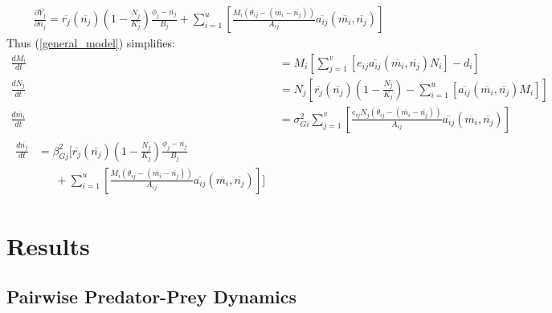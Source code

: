 \documentclass{amsart}
\theoremstyle{definition}
\theoremstyle{remark}
\numberwithin{equation}{section}
\begin{document}
\begin{equation}
	\label{model_2_prey_fitness_partial}
	\begin{aligned}
		\frac{\partial \overline{Y_j}}{\partial \overline{n_j}} = \overline{r_j}(\overline{n_j})\left(1 - \frac{N_j}{K_j}\right)\frac{\phi_j - \overline{n_j}}{B_j} + \sum\limits_{i = 1}^{u}\left[\frac{M_i(\theta_{ij} - (\overline{m_i} - \overline{n_j}))}{A_{ij}}\overline{a_{ij}}(\overline{m_i}, \overline{n_j})\right]
	\end{aligned}
\end{equation}
Thus (\ref{general_model}) simplifies:
\begin{subequations}
	\label{model2}
	\begin{align}
		\label{eq:model2_a}
		\frac{dM_i}{dt} &= M_i\left[\sum\limits_{j = 1}^{v}\left[e_{ij}\overline{a_{ij}}(\overline{m_i}, \overline{n_j})N_i\right] - d_i\right] \\[5px]
		\label{eq:model2_b}
		\frac{dN_j}{dt} &= N_j\left[\overline{r_j}(\overline{n_j})\left(1 - \frac{N_j}{K_j}\right) - \sum\limits_{i = 1}^{u}\left[\overline{a_{ij}}(\overline{m_i}, \overline{n_j})M_i\right]\right] \\[5px]
		\label{eq:model2_c}
		\frac{d\overline{m_i}}{dt} &= \sigma_{Gi}^2\sum\limits_{j = 1}^{v}\left[\frac{e_{ij}N_j(\theta_{ij} - (\overline{m_i} - \overline{n_j}))}{A_{ij}}\overline{a_{ij}}(\overline{m_i}, \overline{n_j})\right] \\[5px]
		\label{eq:model2_d}
		\begin{split}
			\frac{d\overline{n_j}}{dt} &= \beta_{Gj}^2\Bigg[\overline{r_j}(\overline{n_j})\left(1 - \frac{N_j}{K_j}\right)\frac{\phi_j - \overline{n_j}}{B_j} \\
			&\ \ \ \ \ \ \ + \sum\limits_{i = 1}^{u}\left[\frac{M_i(\theta_{ij} - (\overline{m_i} - \overline{n_j}))}{A_{ij}}\overline{a_{ij}}(\overline{m_i}, \overline{n_j})\right]\Bigg]
		\end{split}
	\end{align}
\end{subequations}


\section{Results}
\subsection{Pairwise Predator-Prey Dynamics}
\end{document}

